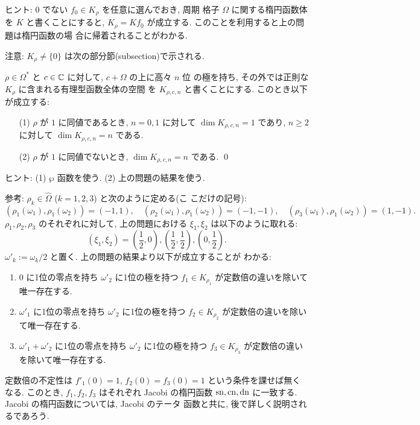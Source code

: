 \documentclass[12pt,twoside]{jarticle}
\def\pe{\wp}
\def\sn{\mathop{\text{\rm sn}}\nolimits}
\def\cn{\mathop{\text{\rm cn}}\nolimits}
\def\dn{\mathop{\text{\rm dn}}\nolimits}
\def\Omegahat{\widehat\Omega}
\def\C{{\Bbb C}} %
\begin{document}
\noindent ヒント: $0$ でない $f_0\in K_\rho$ を任意に選んでおき, 周期
格子 $\Omega$ に関する楕円函数体を $K$ と書くことにすると, %
$K_\rho=K f_0$ が成立する. このことを利用すると上の問題は楕円函数の場
合に帰着されることがわかる.

\medskip

\noindent 注意: $K_\rho\ne\{0\}$ は次の部分節(subsection)で示される.

\begin{question}
  $\rho\in\Omega^*$ と $c\in\C$ に対して, $c+\Omega$ の上に高々 $n$ 位
  の極を持ち, その外では正則な $K_\rho$ に含まれる有理型函数全体の空間
  を $K_{\rho,c,n}$ と書くことにする. このとき以下が成立する:
  \begin{enumerate}
  \item[(1)] $\rho$ が $1$ に同値であるとき, 
    $n=0,1$ に対して $\dim K_{\rho,c,n}=1$ であり, %
    $n\ge2$ に対して $\dim K_{\rho,c,n}=n$ である. 
  \item[(2)] $\rho$ が $1$ に同値でないとき, %
    $\dim K_{\rho,c,n}=n$ である. \qed
  \end{enumerate}
\end{question}

\noindent ヒント: (1) $\pe$ 函数を使う. (2) 上の問題の結果を使う.

\medskip

\noindent 参考: $\rho_k\in\Omegahat$ ($k=1,2,3$) と次のように定める(こ
こだけの記号):
\[
  (\rho_1(\omega_1),\rho_1(\omega_2))=(-1,1),
  \quad
  (\rho_2(\omega_1),\rho_1(\omega_2))=(-1,-1),
  \quad
  (\rho_3(\omega_1),\rho_1(\omega_2))=(1,-1).
\]
$\rho_1,\rho_2,\rho_3$ のそれぞれに対して, 上の問題における %
$\xi_1,\xi_2$ は以下のように取れる:
\[
\textstyle
  (\xi_1,\xi_2)
  =
  (\frac{1}{2},0), 
  (\frac{1}{2},\frac{1}{2}),
  (0,\frac{1}{2}).
\]
$\omega'_k:=\omega_k/2$ と置く. 上の問題の結果より以下が成立することが
わかる: 
\begin{enumerate}
\item $0$ に1位の零点を持ち %
  $\omega'_2$ に1位の極を持つ %
  $f_1\in K_{\rho_1}$ が定数倍の違いを除いて唯一存在する.
\item $\omega'_1$ に1位の零点を持ち %
  $\omega'_2$ に1位の極を持つ %
  $f_2\in K_{\rho_2}$ が定数倍の違いを除いて唯一存在する.
\item $\omega'_1+\omega'_2$ に1位の零点を持ち %
  $\omega'_2$ に1位の極を持つ %
  $f_3\in K_{\rho_3}$ が定数倍の違いを除いて唯一存在する.
\end{enumerate}
定数倍の不定性は $f'_1(0)=1$, $f_2(0)=f_3(0)=1$ という条件を課せば無く
なる. このとき, $f_1,f_2,f_3$ はそれぞれ Jacobi の楕円函数 %
$\sn,\cn,\dn$ に一致する. Jacobi の楕円函数については, Jacobi のテータ
函数と共に, 後で詳しく説明されるであろう.
\end{document}

